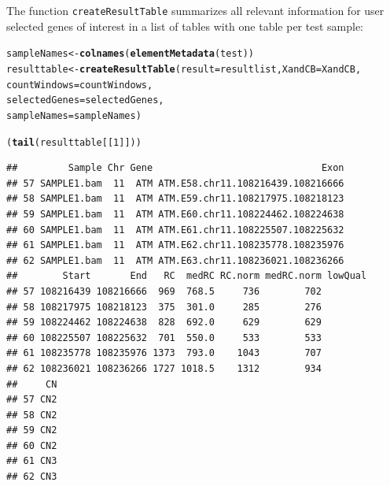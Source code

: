 \documentclass[article]{bioinf}\usepackage[]{graphicx}\usepackage[]{color}
\makeatletter
\newcommand{\hlnum}[1]{\textcolor[rgb]{0.686,0.059,0.569}{#1}}%
\newcommand{\hlstd}[1]{\textcolor[rgb]{0.345,0.345,0.345}{#1}}%
\newcommand{\hlkwb}[1]{\textcolor[rgb]{0.69,0.353,0.396}{#1}}%
\newcommand{\hlkwc}[1]{\textcolor[rgb]{0.333,0.667,0.333}{#1}}%
\newcommand{\hlkwd}[1]{\textcolor[rgb]{0.737,0.353,0.396}{\textbf{#1}}}%
\newenvironment{kframe}{%
 \def\at@end@of@kframe{}%
 \ifinner\ifhmode%
  \def\at@end@of@kframe{\end{minipage}}%
  \begin{minipage}{\columnwidth}%
 \fi\fi%
 \def\FrameCommand##1{\hskip\@totalleftmargin \hskip-\fboxsep
 \colorbox{shadecolor}{##1}\hskip-\fboxsep
     \hskip-\linewidth \hskip-\@totalleftmargin \hskip\columnwidth}%
 \MakeFramed {\advance\hsize-\width
   \@totalleftmargin\z@ \linewidth\hsize
   \@setminipage}}%
 {\par\unskip\endMakeFramed%
 \at@end@of@kframe}
\newenvironment{knitrout}{}{} %
\makeatother
\begin{document}
The function \verb+createResultTable+ summarizes all relevant information for 
user selected genes of interest in a list of tables with one table per test 
sample:


\begin{knitrout}
\color{fgcolor}\begin{kframe}
\begin{alltt}
\hlstd{sampleNames} \hlkwb{<-} \hlkwd{colnames}\hlstd{(}\hlkwd{elementMetadata}\hlstd{(test))}
\hlstd{resulttable} \hlkwb{<-} \hlkwd{createResultTable}\hlstd{(}\hlkwc{result} \hlstd{= resultlist,} \hlkwc{XandCB} \hlstd{= XandCB,}
                                    \hlkwc{countWindows} \hlstd{= countWindows,}
                                    \hlkwc{selectedGenes} \hlstd{= selectedGenes,}
                                    \hlkwc{sampleNames} \hlstd{= sampleNames)}
\end{alltt}


{\ttfamily\noindent\itshape\color{messagecolor}{\#\# Calculating results for sample(s) SAMPLE1.bam}}

{\ttfamily\noindent\itshape\color{messagecolor}{\#\# Building table...}}

{\ttfamily\noindent\itshape\color{messagecolor}{\#\# Finished}}\begin{alltt}
\hlstd{(}\hlkwd{tail}\hlstd{(resulttable[[}\hlnum{1}\hlstd{]]))}
\end{alltt}
\begin{verbatim}
##         Sample Chr Gene                              Exon
## 57 SAMPLE1.bam  11  ATM ATM.E58.chr11.108216439.108216666
## 58 SAMPLE1.bam  11  ATM ATM.E59.chr11.108217975.108218123
## 59 SAMPLE1.bam  11  ATM ATM.E60.chr11.108224462.108224638
## 60 SAMPLE1.bam  11  ATM ATM.E61.chr11.108225507.108225632
## 61 SAMPLE1.bam  11  ATM ATM.E62.chr11.108235778.108235976
## 62 SAMPLE1.bam  11  ATM ATM.E63.chr11.108236021.108236266
##        Start       End   RC  medRC RC.norm medRC.norm lowQual
## 57 108216439 108216666  969  768.5     736        702        
## 58 108217975 108218123  375  301.0     285        276        
## 59 108224462 108224638  828  692.0     629        629        
## 60 108225507 108225632  701  550.0     533        533        
## 61 108235778 108235976 1373  793.0    1043        707        
## 62 108236021 108236266 1727 1018.5    1312        934        
##     CN
## 57 CN2
## 58 CN2
## 59 CN2
## 60 CN2
## 61 CN3
## 62 CN3
\end{verbatim}
\end{kframe}
\end{knitrout}
\end{document}
